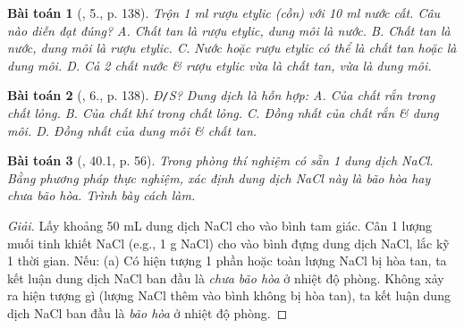 \documentclass{article}
\newtheorem{baitoan}{Bài toán}
\begin{document}
\begin{baitoan}[\cite{SGK_Hoa_Hoc_8}, 5., p. 138]
	Trộn \emph{1 ml} rượu etylic (cồn) với \emph{10 ml} nước cất. Câu nào diễn đạt đúng? {\sf A.} Chất tan là rượu etylic, dung môi là nước. {\sf B.} Chất tan là nước, dung môi là rượu etylic. {\sf C.} Nước hoặc rượu etylic có thể là chất tan hoặc là dung môi. {\sf D.} Cả 2 chất nước \& rượu etylic vừa là chất tan, vừa là dung môi.
\end{baitoan}

\begin{baitoan}[\cite{SGK_Hoa_Hoc_8}, 6., p. 138]
	\emph{Đ\texttt{/}S?} Dung dịch là hỗn hợp: {\sf A.} Của chất rắn trong chất lỏng. {\sf B.} Của chất khí trong chất lỏng. {\sf C.} Đồng nhất của chất rắn \& dung môi. {\sf D.} Đồng nhất của dung môi \& chất tan.
\end{baitoan}

\begin{baitoan}[\cite{SBT_Hoa_Hoc_8}, 40.1, p. 56]
	Trong phòng thí nghiệm có sẵn 1 dung dịch \emph{NaCl}. Bằng phương pháp thực nghiệm, xác định dung dịch \emph{NaCl} này là bão hòa hay chưa bão hòa. Trình bày cách làm.
\end{baitoan}

\begin{proof}[Giải]
	Lấy khoảng 50 mL dung dịch NaCl cho vào bình tam giác. Cân 1 lượng muối tinh khiết NaCl (e.g., 1 g NaCl) cho vào bình đựng dung dịch NaCl, lắc kỹ 1 thời gian. Nếu: (a) Có hiện tượng 1 phần hoặc toàn lượng NaCl bị hòa tan, ta kết luận dung dịch NaCl ban đầu là \textit{chưa bão hòa} ở nhiệt độ phòng. Không xảy ra hiện tượng gì (lượng NaCl thêm vào bình không bị hòa tan), ta kết luận dung dịch NaCl ban đầu là \textit{bão hòa} ở nhiệt độ phòng.
\end{proof}
\end{document}
